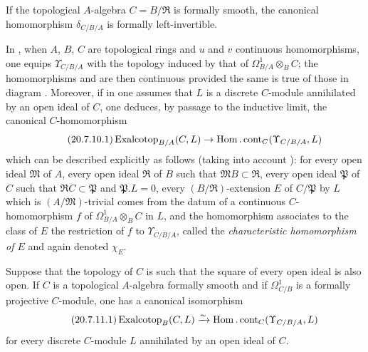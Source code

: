 \begin{corollary}[20.7.9]
\label{0.20.7.9}
If the topological $A$-algebra $C=B/\mathfrak{R}$ is formally smooth, the canonical homomorphism $\delta_{C/B/A}$ is formally left-invertible.
\end{corollary}

\begin{env}[20.7.10]
\label{0.20.7.10}
In , when $A$, $B$, $C$ are topological rings and $u$ and $v$ continuous homomorphisms, one equips $\Upsilon_{C/B/A}$ with the topology induced by that of $\Omega^1_{B/A}\otimes_B C$; the homomorphisms  and  are then continuous provided the same is true of those in diagram . Moreover, if in  one assumes that $L$ is a discrete $C$-module annihilated by an open ideal of $C$, one deduces, by passage to the inductive limit, the canonical $C$-homomorphism
\begin{equation}
\tag{20.7.10.1}
  \label{0.20.7.10.1}
  \operatorname{Exalcotop}_{B/A}(C,L)\to\operatorname{Hom}.\operatorname{cont}_C(\Upsilon_{C/B/A},L)
\end{equation}
which can be described explicitly as follows (taking into account ): for every open ideal $\mathfrak{M}$ of $A$, every open ideal $\mathfrak{R}$ of $B$ such that $\mathfrak{M}B\subset\mathfrak{R}$, every open ideal $\mathfrak{P}$ of $C$ such that $\mathfrak{R}C\subset\mathfrak{P}$ and $\mathfrak{P}.L=0$, every $(B/\mathfrak{R})$-extension $E$ of $C/\mathfrak{P}$ by $L$ which is $(A/\mathfrak{M})$-trivial comes from the datum of a continuous $C$-homomorphism $f$ of $\Omega^1_{B/A}\otimes_B C$ in $L$, and the homomorphism  associates to the class of $E$ the restriction of $f$ to $\Upsilon_{C/B/A}$, called the \emph{characteristic homomorphism of $E$} and again denoted $\chi_E$.
\end{env}

\begin{proposition}[20.7.11]
\label{0.20.7.11}
Suppose that the topology of $C$ is such that the square of every open ideal is also open.
If $C$ is a topological $A$-algebra formally smooth and if $\Omega^1_{C/B}$ is a formally projective $C$-module, one has a canonical isomorphism
\begin{equation}
\tag{20.7.11.1}
  \label{0.20.7.11.1}
  \operatorname{Exalcotop}_B(C,L)\xrightarrow{\sim}\operatorname{Hom}.\operatorname{cont}_C(\Upsilon_{C/B/A},L)
\end{equation}
for every discrete $C$-module $L$ annihilated by an open ideal of $C$.
\end{proposition}

